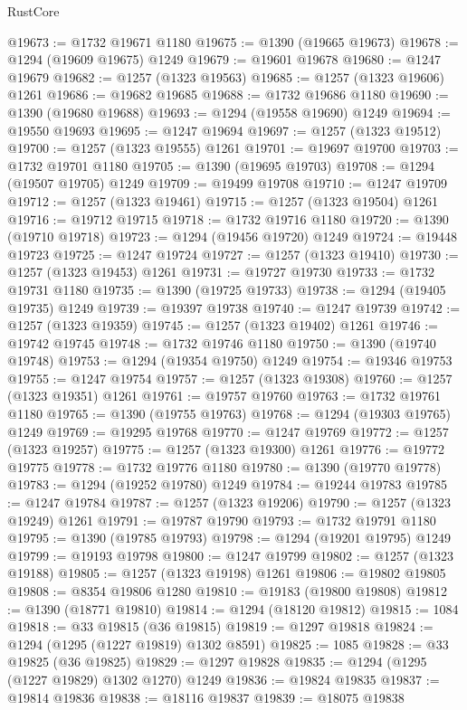 \begin{lexlean}{RustCore}
\begin{coremodule}
@19673 := @1732 @19671 @1180
@19675 := @1390 (@19665 @19673)
@19678 := @1294 (@19609 @19675) @1249
@19679 := @19601 @19678
@19680 := @1247 @19679
@19682 := @1257 (@1323 @19563)
@19685 := @1257 (@1323 @19606) @1261
@19686 := @19682 @19685
@19688 := @1732 @19686 @1180
@19690 := @1390 (@19680 @19688)
@19693 := @1294 (@19558 @19690) @1249
@19694 := @19550 @19693
@19695 := @1247 @19694
@19697 := @1257 (@1323 @19512)
@19700 := @1257 (@1323 @19555) @1261
@19701 := @19697 @19700
@19703 := @1732 @19701 @1180
@19705 := @1390 (@19695 @19703)
@19708 := @1294 (@19507 @19705) @1249
@19709 := @19499 @19708
@19710 := @1247 @19709
@19712 := @1257 (@1323 @19461)
@19715 := @1257 (@1323 @19504) @1261
@19716 := @19712 @19715
@19718 := @1732 @19716 @1180
@19720 := @1390 (@19710 @19718)
@19723 := @1294 (@19456 @19720) @1249
@19724 := @19448 @19723
@19725 := @1247 @19724
@19727 := @1257 (@1323 @19410)
@19730 := @1257 (@1323 @19453) @1261
@19731 := @19727 @19730
@19733 := @1732 @19731 @1180
@19735 := @1390 (@19725 @19733)
@19738 := @1294 (@19405 @19735) @1249
@19739 := @19397 @19738
@19740 := @1247 @19739
@19742 := @1257 (@1323 @19359)
@19745 := @1257 (@1323 @19402) @1261
@19746 := @19742 @19745
@19748 := @1732 @19746 @1180
@19750 := @1390 (@19740 @19748)
@19753 := @1294 (@19354 @19750) @1249
@19754 := @19346 @19753
@19755 := @1247 @19754
@19757 := @1257 (@1323 @19308)
@19760 := @1257 (@1323 @19351) @1261
@19761 := @19757 @19760
@19763 := @1732 @19761 @1180
@19765 := @1390 (@19755 @19763)
@19768 := @1294 (@19303 @19765) @1249
@19769 := @19295 @19768
@19770 := @1247 @19769
@19772 := @1257 (@1323 @19257)
@19775 := @1257 (@1323 @19300) @1261
@19776 := @19772 @19775
@19778 := @1732 @19776 @1180
@19780 := @1390 (@19770 @19778)
@19783 := @1294 (@19252 @19780) @1249
@19784 := @19244 @19783
@19785 := @1247 @19784
@19787 := @1257 (@1323 @19206)
@19790 := @1257 (@1323 @19249) @1261
@19791 := @19787 @19790
@19793 := @1732 @19791 @1180
@19795 := @1390 (@19785 @19793)
@19798 := @1294 (@19201 @19795) @1249
@19799 := @19193 @19798
@19800 := @1247 @19799
@19802 := @1257 (@1323 @19188)
@19805 := @1257 (@1323 @19198) @1261
@19806 := @19802 @19805
@19808 := @8354 @19806 @1280
@19810 := @19183 (@19800 @19808)
@19812 := @1390 (@18771 @19810)
@19814 := @1294 (@18120 @19812)
@19815 := 1084
@19818 := @33 @19815 (@36 @19815)
@19819 := @1297 @19818
@19824 := @1294 (@1295 (@1227 @19819) @1302 @8591)
@19825 := 1085
@19828 := @33 @19825 (@36 @19825)
@19829 := @1297 @19828
@19835 := @1294 (@1295 (@1227 @19829) @1302 @1270) @1249
@19836 := @19824 @19835
@19837 := @19814 @19836
@19838 := @18116 @19837
@19839 := @18075 @19838

\end{coremodule}
\end{lexlean}
